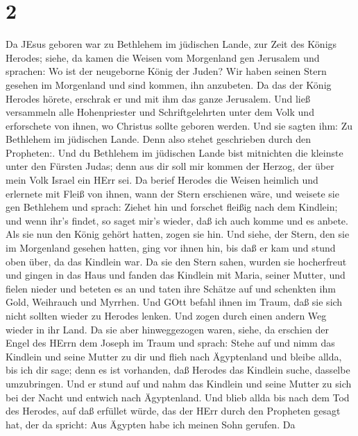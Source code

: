 \hypertarget{section-1}{%
\section{2}\label{section-1}}

 Da JEsus geboren war zu Bethlehem im jüdischen Lande, zur
Zeit des Königs Herodes; siehe, da kamen die Weisen vom Morgenland gen
Jerusalem und sprachen:  Wo ist der neugeborne König der
Juden? Wir haben seinen Stern gesehen im Morgenland und sind kommen, ihn
anzubeten.  Da das der König Herodes hörete, erschrak er und
mit ihm das ganze Jerusalem.  Und ließ versammeln alle
Hohenpriester und Schriftgelehrten unter dem Volk und erforschete von
ihnen, wo Christus sollte geboren werden.  Und sie sagten
ihm: Zu Bethlehem im jüdischen Lande. Denn also stehet geschrieben durch
den Propheten:.  Und du Bethlehem im jüdischen Lande bist
mitnichten die kleinste unter den Fürsten Judas; denn aus dir soll mir
kommen der Herzog, der über mein Volk Israel ein HErr sei. 
Da berief Herodes die Weisen heimlich und erlernete mit Fleiß von ihnen,
wann der Stern erschienen wäre,  und weisete sie gen
Bethlehem und sprach: Ziehet hin und forschet fleißig nach dem Kindlein;
und wenn ihr's findet, so saget mir's wieder, daß ich auch komme und es
anbete.  Als sie nun den König gehört hatten, zogen sie hin.
Und siehe, der Stern, den sie im Morgenland gesehen hatten, ging vor
ihnen hin, bis daß er kam und stund oben über, da das Kindlein war.
 Da sie den Stern sahen, wurden sie hocherfreut
 und gingen in das Haus und fanden das Kindlein mit Maria,
seiner Mutter, und fielen nieder und beteten es an und taten ihre
Schätze auf und schenkten ihm Gold, Weihrauch und Myrrhen. 
Und GOtt befahl ihnen im Traum, daß sie sich nicht sollten wieder zu
Herodes lenken. Und zogen durch einen andern Weg wieder in ihr Land.
 Da sie aber hinweggezogen waren, siehe, da erschien der
Engel des HErrn dem Joseph im Traum und sprach: Stehe auf und nimm das
Kindlein und seine Mutter zu dir und flieh nach Ägyptenland und bleibe
allda, bis ich dir sage; denn es ist vorhanden, daß Herodes das Kindlein
suche, dasselbe umzubringen.  Und er stund auf und nahm das
Kindlein und seine Mutter zu sich bei der Nacht und entwich nach
Ägyptenland.  Und blieb allda bis nach dem Tod des Herodes,
auf daß erfüllet würde, das der HErr durch den Propheten gesagt hat, der
da spricht: Aus Ägypten habe ich meinen Sohn gerufen.  Da
